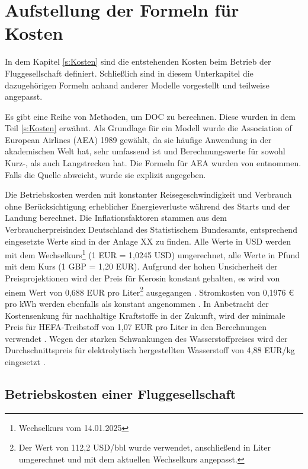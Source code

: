 \section{Aufstellung der Formeln für Kosten}
\label{s:Aufstellung der Formeln für Kosten}

In dem Kapitel \ref{s:Kosten} sind die entstehenden Kosten beim Betrieb der Fluggesellschaft definiert.
Schließlich sind in diesem Unterkapitel die dazugehörigen Formeln anhand anderer Modelle vorgestellt und teilweise angepasst. 

Es gibt eine Reihe von Methoden, um DOC zu berechnen. 
Diese wurden in dem Teil \ref{s:Kosten} erwähnt.
Als Grundlage für ein Modell wurde die Association of European Airlines (AEA) 1989 gewählt, 
da sie häufige Anwendung in der akademischen Welt hat, 
sehr umfassend ist und Berechnungswerte für sowohl Kurz-, als auch Langstrecken hat. 
Die Formeln für AEA wurden von \cite{} entnommen.
Falls die Quelle abweicht, wurde sie explizit angegeben. %

Die Betriebskosten werden mit konstanter Reisegeschwindigkeit und Verbrauch ohne 
Berücksichtigung erheblicher Energieverluste während des Starts und der Landung berechnet. 
Die Inflationsfaktoren stammen aus dem Verbraucherpreisindex Deutschland des Statistischem Bundesamts, 
entsprechend eingesetzte Werte sind in der Anlage XX zu finden. %
Alle Werte in USD werden mit dem Wechselkurs\footnote{Wechselkurs vom 14.01.2025} (1 EUR = 1,0245 USD)
umgerechnet, alle Werte in Pfund mit dem Kurs (1 GBP = 1,20 EUR).
Aufgrund der hohen Unsicherheit der Preisprojektionen wird der Preis für Kerosin 
konstant gehalten, es wird von einem Wert von 0,688 EUR pro Liter\footnote{Der Wert von 112,2 USD/bbl 
wurde verwendet, anschließend in Liter umgerechnet und mit dem aktuellen Wechselkurs angepasst.} 
ausgegangen \cite{iata_industry_statistics_2024}. 
Stromkosten von 0,1976 € pro kWh werden ebenfalls als konstant angenommen \cite{eurostat_nrg_pc_205}.
In Anbetracht der Kostensenkung für nachhaltige Kraftstoffe in der Zukunft, 
wird der minimale Preis für HEFA-Treibstoff von 1,07 EUR pro Liter in den Berechnungen verwendet \cite{watson2024sustainable}.
Wegen der starken Schwankungen des Wasserstoffpreises wird der Durchschnittspreis für 
elektrolytisch hergestellten Wasserstoff von 4,88 EUR/kg eingesetzt \cite{hoelzen2022hydrogen}.
%
%
\subsection{Betriebskosten einer Fluggesellschaft}

